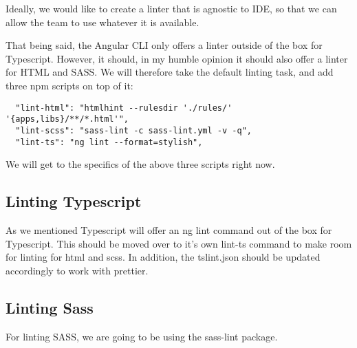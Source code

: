 Ideally, we would like to create a linter that is agnostic to IDE, so that we
can allow the team to use whatever it is available.

That being said, the Angular CLI only offers a linter outside of the box for
Typescript. However, it should, in my humble opinion it should also offer a
linter for HTML and SASS. We will therefore take the default linting task, and
add three npm scripts on top of it:

\begin{verbatim}
  "lint-html": "htmlhint --rulesdir './rules/' '{apps,libs}/**/*.html'",
  "lint-scss": "sass-lint -c sass-lint.yml -v -q",
  "lint-ts": "ng lint --format=stylish",
\end{verbatim}

We will get to the specifics of the above three scripts right now.

\subsection{ Linting Typescript }
As we mentioned Typescript will offer an ng lint command out of the box for
Typescript. This should be moved over to it's own lint-ts command to make room
for linting for html and scss. In addition, the tslint.json should be updated
accordingly to work with prettier.

\subsection{ Linting Sass }
For linting SASS, we are going to be using the sass-lint package. 
